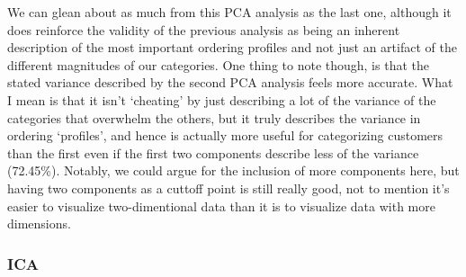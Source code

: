\documentclass{article}
\begin{document}
We can glean about as much from this PCA analysis as the last one,
although it does reinforce the validity of the previous analysis as
being an inherent description of the most important ordering profiles
and not just an artifact of the different magnitudes of our categories.
One thing to note though, is that the stated variance described by the
second PCA analysis feels more accurate. What I mean is that it isn't
`cheating' by just describing a lot of the variance of the categories
that overwhelm the others, but it truly describes the variance in
ordering `profiles', and hence is actually more useful for categorizing
customers than the first even if the first two components describe less
of the variance (72.45\%). Notably, we could argue for the inclusion of
more components here, but having two components as a cuttoff point is
still really good, not to mention it's easier to visualize
two-dimentional data than it is to visualize data with more dimensions.

    \subsubsection{ICA}\label{ica}
\end{document}
